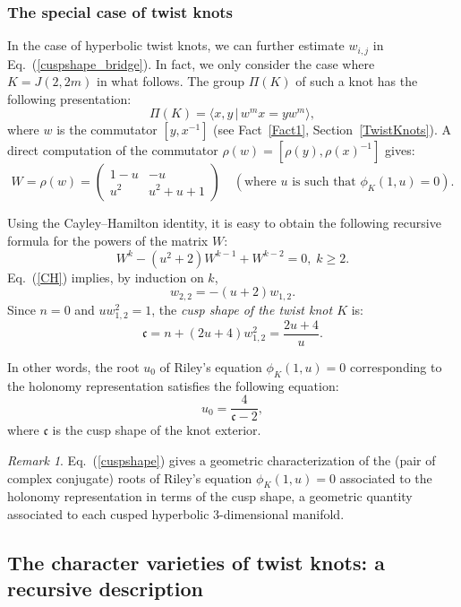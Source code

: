 \documentclass[a4paper]{amsart}
\theoremstyle{plain}
\theoremstyle{definition}
\theoremstyle{remark}
\newtheorem{remark}{Remark}%
\newcommand{\cusp}{{\mathfrak{c}}}
\begin{document}
\subsubsection{The special case of twist knots}
In the case of hyperbolic twist knots, we can further estimate $w_{i,j}$ in Eq.~(\ref{cuspshape_bridge}). In fact, we only consider the case where $K = J(2, 2m)$ in what follows. 
The group $\Pi(K)$ of such a knot has the following presentation:
\[
\Pi(K) = \langle {x, y \, |\, w^m x = y w^m} \rangle,
\]
where $w$ is the commutator $[y,x^{-1}]$ (see Fact~\ref{Fact1}, Section~\ref{TwistKnots}). A direct computation of the commutator $\rho(w) = [\rho(y),\rho(x)^{-1}]$ gives:
\[
W= \rho(w) = \left(
\begin{array}{cc}
  1-u  & -u \\
  u^2  & u^2+u+1
\end{array}
\right) \quad (\text{where } u \text{ is such that } \phi_K(1,u) = 0).
\]

Using the Cayley--Hamilton identity, it is easy to obtain the following recursive formula for the powers of the matrix $W$:
\begin{equation}\label{CH}
W^k - (u^2+2) W^{k-1} + W^{k-2} = 0, \; k \geqslant 2.
\end{equation}
Eq.~(\ref{CH}) implies, by induction on $k$,
\[
w_{2,2} = - (u+2) w_{1,2}.
\]
Since $n = 0$ and $u w_{1,2}^2 = 1$, the \emph{cusp shape of the twist knot $K$} is:
\[
\cusp = n + (2u+4)w_{1,2}^2 = \frac{2u+4}{u}.
\]


    In other words, the root $u_0$ of Riley's equation $\phi_K(1,u) = 0$ corresponding to the holonomy representation satisfies the following equation:
\begin{equation}\label{cuspshape}
u_0 = \frac{4}{\cusp - 2},
\end{equation}
where $\cusp$ is the cusp shape of the knot exterior.

\begin{remark}
Eq.~(\ref{cuspshape}) gives a geometric characterization of the (pair of complex conjugate) roots of Riley's equation $\phi_K(1,u) = 0$ associated to the holonomy representation in terms of the cusp shape, a geometric quantity associated to each cusped hyperbolic $3$-dimensional manifold.
\end{remark}


\subsection{The character varieties of twist knots: a recursive description}
\end{document}

